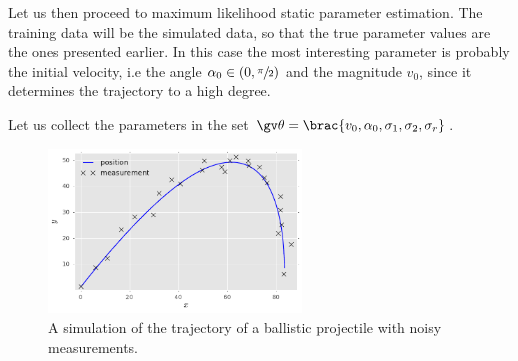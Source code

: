 Let us then proceed to maximum likelihood static parameter estimation. The training
data will be the simulated data, so that the true parameter values are the ones presented
earlier. In this case the most interesting parameter is probably the initial velocity,
i.e the angle $\alpha_0\in(0,\sfrac{\pi}{2})$ and the magnitude $v_0$, since it determines
the trajectory to a high degree.

 
Let us collect the parameters in the set $\Th=\brac{v_0,\alpha_0,\sigma_1,\sigma_2,\sigma_r}$.


\begin{figure}[htb]%
    \centering%
    \includegraphics[width=0.6\textwidth]{img/ex1_pos_meas}%
	\caption{A simulation of the trajectory of a ballistic projectile with noisy measurements.}
	\label{fig:ballistic2D_simulation}
 \end{figure}



